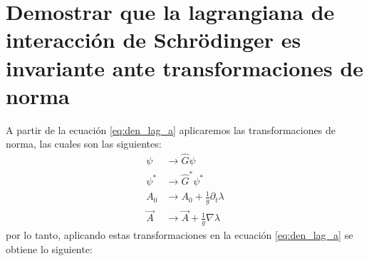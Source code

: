 \section{Demostrar que la lagrangiana de interacción de Schrödinger es invariante ante
transformaciones de norma}
A partir de la ecuación \ref{eq:den_lag_a} aplicaremos las transformaciones de norma, las cuales son las siguientes:
\begin{align*}
    \psi &\rightarrow \hat{G}\psi\\
    \psi^* & \rightarrow \hat{G}^* \psi^* \\
    A_0 & \rightarrow A_0+\frac{1}{g} \partial_t \lambda \\
    \vec{A} & \rightarrow \vec{A}+ \frac{1}{g} \nabla \lambda
\end{align*}
por lo tanto, aplicando estas transformaciones en la ecuación \ref{eq:den_lag_a} se obtiene lo siguiente:
